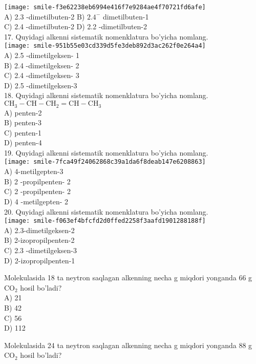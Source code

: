 \texttt{[image: smile-f3e62238eb6994e416f7e9284ae4f70721fd6afe]}\\
A) 2.3 -dimetilbuten-2 
B) $2.4^{-}$ dimetilbuten-1\\
C) 2.4 -dimetilbuten-2 
D) 2.2 -dimetilbuten-2\\
17. Quyidagi alkenni sistematik nomenklatura bo'yicha nomlang.\\
\texttt{[image: smile-951b55e03cd339d5fe3deb892d3ac262f0e264a4]}\\
A) 2.5 -dimetilgeksen- 1\\
B) 2.4 -dimetilgeksen- 2\\
C) 2.4 -dimetilgeksen- 3\\
D) 2.5 -dimetilgeksen-3\\
18. Quyidagi alkenni sistematik nomenklatura bo'yicha nomlang.\\
$\mathrm{CH}_{3}-\mathrm{CH}-\mathrm{CH}_{2}=\mathrm{CH}-\mathrm{CH}_{3}$\\
A) penten-2\\ 
B) penten-3\\
C) penten-1\\ 
D) penten-4\\
19. Quyidagi alkenni sistematik nomenklatura bo'yicha nomlang.\\
\texttt{[image: smile-7fca49f24062868c39a1da6f8deab147e6208863]}\\
A) 4-metilgepten-3\\
B) 2 -propilpenten- 2\\
C) 2 -propilpenten- 2\\
D) 4 -metilgepten- 2\\
20. Quyidagi alkenni sistematik nomenklatura bo'yicha nomlang.\\
\texttt{[image: smile-f063ef4bfcfd2d0ffed2258f3aafd1901288188f]}\\
A) 2.3-dimetilgeksen-2\\
B) 2-izopropilpenten-2\\
C) 2.3 -dimetilgeksen-3\\
D) 2-izopropilpenten-1
  \item Molekulasida 18 ta neytron saqlagan alkenning necha g miqdori yonganda 66 g $\mathrm{CO}_{2}$ hosil bo'ladi?\\
A) 21\\ 
B) 42\\
C) 56\\
D) 112\\
  \item Molekulasida 24 ta neytron saqlagan alkenning necha g miqdori yonganda 88 g $\mathrm{CO}_{2}$ hosil bo'ladi?\\
